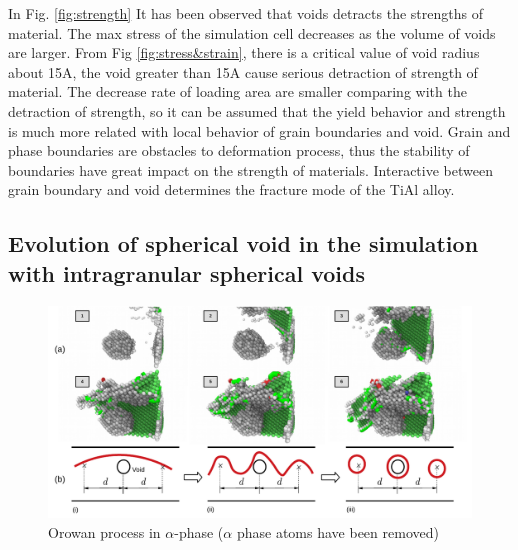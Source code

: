 \documentclass[metals,article,submit,moreauthors,pdftex,10pt,a4paper]{Definitions/mdpi}
\begin{document}
In Fig. \ref{fig:strength} It has been observed that voids detracts the strengths of  material. The max stress  of the simulation cell decreases as the volume of voids are larger. From Fig \ref{fig:stress&strain}, there is a critical value of void radius about 15A, the void greater than 15A cause serious detraction of strength of material.  The decrease rate of loading area are smaller comparing with the detraction of strength, so it can be assumed that the  yield behavior and strength is much more related with local behavior of grain boundaries and void. Grain and phase boundaries are obstacles to deformation process, thus the stability of boundaries have great impact on the strength of materials. Interactive between grain boundary and void determines the fracture mode of the TiAl alloy.

\subsection{Evolution of spherical void in the simulation with intragranular spherical voids}

\begin{figure}[ht]
	\centering
	\includegraphics[width=1\linewidth]{"img/dis-void2"}
	\caption{Orowan process in $\alpha$-phase ($\alpha$ phase atoms have been removed)}
	\label{fig:orowan}
\end{figure}
\end{document}
